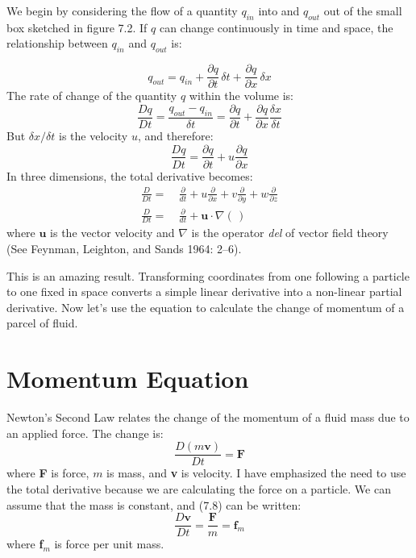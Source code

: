We begin by considering the flow of a quantity $q_{in}$ into and
$q_{out}$ out of the small box sketched in figure 7.2. If $q$ can
change continuously in time and space, the relationship between
$q_{in}$ and $q_{out}$ is:

\begin{equation}
q_{out} = q_{in} + \frac{\partial{q}}{\partial{t}}\,\delta{t} +
\frac{\partial{q}}{\partial{x}}\,\delta{x}
\end{equation}
The rate of change of the quantity $q$ within the volume is:
\begin{equation}
\frac{Dq}{Dt} = \frac{q_{out} - q_{in}}{\delta{t}}=
\frac{\partial{q}}{\partial{t}} +
\frac{\partial{q}}{\partial{x}}\frac{\delta{x}}{\delta{t}}
\end{equation}
But $\delta x /\delta t$ is the velocity $u$, and therefore:
\begin{displaymath}
\frac{Dq}{Dt} = \frac{\partial{q}}{\partial{t}} +
u\frac{\partial{q}}{\partial{x}}
\end{displaymath}
In three dimensions, the total derivative becomes:
\begin{subequations}
\begin{align}
\frac{D}{Dt} = & \:\frac{\partial}{dt} + u\frac{\partial}{\partial{x}} + v\frac{\partial}{\partial y} + w\frac{\partial
}{\partial z}
\\
\frac{D}{Dt} = & \:\frac{\partial}{dt} +
\mathbf{u}\cdot \nabla(\,)
\end{align}
\end{subequations}
where $\mathbf{u}$ is the vector velocity and $\nabla$ is the operator
\textit{del} of vector field theory (See Feynman, Leighton, and Sands
1964: 2--6).

This is an amazing result. Transforming coordinates from one following
a particle to one fixed in space converts a simple linear derivative
into a non-linear partial derivative. Now let's use the equation to
calculate the change of momentum of a parcel of fluid.

\section{Momentum Equation}
Newton's Second Law relates the change of the
momentum of a fluid mass due to an applied force. The change is:
\begin{equation}
\frac{D(m\textbf{v})}{Dt} = \textbf{F}
\end{equation}
where \textbf{F} is force, $m$ is mass, and \textbf{v} is velocity. I
have emphasized the need to use the total derivative because we are
calculating the force on a particle. We can assume that the mass is
constant, and (7.8) can be written:
\begin{equation}
\frac{D\textbf{v}}{Dt} = \frac{\textbf{F}}{m} = \textbf{f$_m$}
\end{equation}
where \textbf{f$_m$} is force per unit mass.

